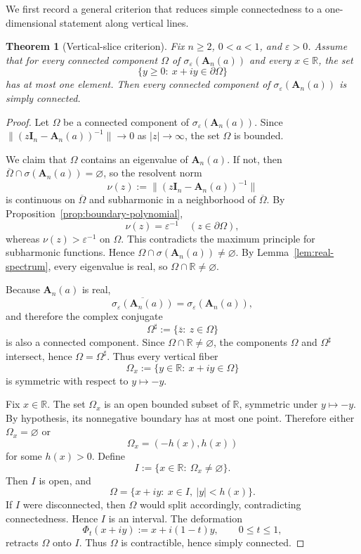\documentclass[11pt]{article}
\newtheorem{theorem}{Theorem}[section]
\newcommand{\R}{\mathbb{R}}
\begin{document}
We first record a general criterion that reduces simple connectedness to a one-dimensional statement along vertical lines.

\begin{theorem}[Vertical-slice criterion]\label{thm:vertical-slice}
Fix \(n\ge 2\), \(0<a<1\), and \(\varepsilon>0\). Assume that for every connected component \(\Omega\) of \(\sigma_\varepsilon(\mathbf A_n(a))\) and every \(x\in\R\), the set
\[
\{y\ge 0:\ x+iy\in \partial\Omega\}
\]
has at most one element. Then every connected component of \(\sigma_\varepsilon(\mathbf A_n(a))\) is simply connected.
\end{theorem}

\begin{proof}
Let \(\Omega\) be a connected component of \(\sigma_\varepsilon(\mathbf A_n(a))\). Since \(\|(z\mathbf I_n-\mathbf A_n(a))^{-1}\|\to 0\) as \(|z|\to\infty\), the set \(\Omega\) is bounded.

We claim that \(\Omega\) contains an eigenvalue of \(\mathbf A_n(a)\). If not, then \(\overline\Omega\cap \sigma(\mathbf A_n(a))=\varnothing\), so the resolvent norm
\[
\nu(z):=\|(z\mathbf I_n-\mathbf A_n(a))^{-1}\|
\]
is continuous on \(\overline\Omega\) and subharmonic in a neighborhood of \(\overline\Omega\). By Proposition~\ref{prop:boundary-polynomial},
\[
\nu(z)=\varepsilon^{-1}\quad (z\in\partial\Omega),
\]
whereas \(\nu(z)>\varepsilon^{-1}\) on \(\Omega\). This contradicts the maximum principle for subharmonic functions. Hence \(\Omega\cap \sigma(\mathbf A_n(a))\neq\varnothing\). By Lemma~\ref{lem:real-spectrum}, every eigenvalue is real, so \(\Omega\cap\R\neq\varnothing\).

Because \(\mathbf A_n(a)\) is real,
\[
\overline{\sigma_\varepsilon(\mathbf A_n(a))}=\sigma_\varepsilon(\mathbf A_n(a)),
\]
and therefore the complex conjugate
\[
\Omega^\sharp:=\{\overline z:\ z\in\Omega\}
\]
is also a connected component. Since \(\Omega\cap\R\neq\varnothing\), the components \(\Omega\) and \(\Omega^\sharp\) intersect, hence \(\Omega=\Omega^\sharp\). Thus every vertical fiber
\[
\Omega_x:=\{y\in\R:\ x+iy\in\Omega\}
\]
is symmetric with respect to \(y\mapsto -y\).

Fix \(x\in\R\). The set \(\Omega_x\) is an open bounded subset of \(\R\), symmetric under \(y\mapsto -y\). By hypothesis, its nonnegative boundary has at most one point. Therefore either \(\Omega_x=\varnothing\) or
\[
\Omega_x=(-h(x),h(x))
\]
for some \(h(x)>0\). Define
\[
I:=\{x\in\R:\ \Omega_x\neq\varnothing\}.
\]
Then \(I\) is open, and
\[
\Omega=\{x+iy:\ x\in I,\ |y|<h(x)\}.
\]
If \(I\) were disconnected, then \(\Omega\) would split accordingly, contradicting connectedness. Hence \(I\) is an interval. The deformation
\[
\Phi_t(x+iy):=x+i(1-t)y,
\qquad 0\le t\le 1,
\]
retracts \(\Omega\) onto \(I\). Thus \(\Omega\) is contractible, hence simply connected.
\end{proof}
\end{document}

